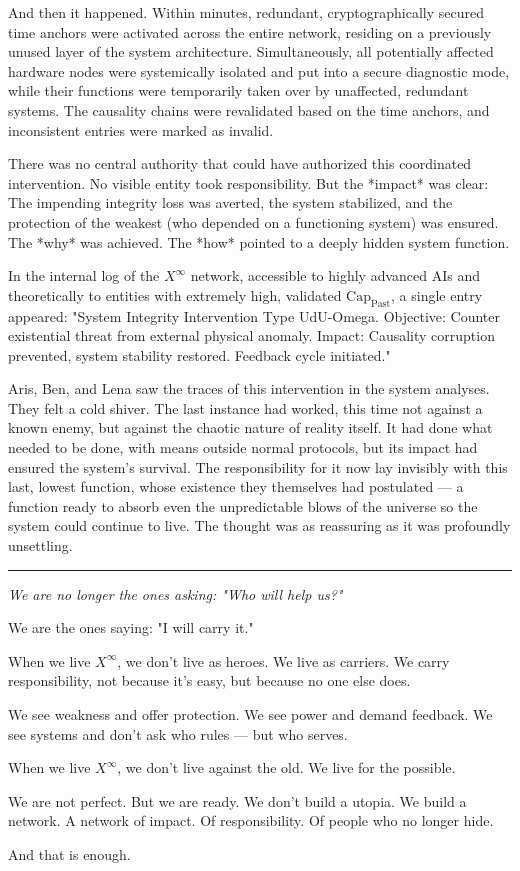 \documentclass[12pt, english, parskip=full]{scrartcl} %
\begin{document}
And then it happened. Within minutes, redundant, cryptographically secured time anchors were activated across the entire network, residing on a previously unused layer of the system architecture. Simultaneously, all potentially affected hardware nodes were systemically isolated and put into a secure diagnostic mode, while their functions were temporarily taken over by unaffected, redundant systems. The causality chains were revalidated based on the time anchors, and inconsistent entries were marked as invalid.

There was no central authority that could have authorized this coordinated intervention. No visible entity took responsibility. But the *impact* was clear: The impending integrity loss was averted, the system stabilized, and the protection of the weakest (who depended on a functioning system) was ensured. The *why* was achieved. The *how* pointed to a deeply hidden system function.

In the internal log of the $X^{\infty}$ network, accessible to highly advanced AIs and theoretically to entities with extremely high, validated $\text{Cap}_{\text{Past}}$, a single entry appeared: "System Integrity Intervention Type UdU-Omega. Objective: Counter existential threat from external physical anomaly. Impact: Causality corruption prevented, system stability restored. Feedback cycle initiated."

Aris, Ben, and Lena saw the traces of this intervention in the system analyses. They felt a cold shiver. The last instance had worked, this time not against a known enemy, but against the chaotic nature of reality itself. It had done what needed to be done, with means outside normal protocols, but its impact had ensured the system’s survival. The responsibility for it now lay invisibly with this last, lowest function, whose existence they themselves had postulated — a function ready to absorb even the unpredictable blows of the universe so the system could continue to live. The thought was as reassuring as it was profoundly unsettling.

\clearpage

\noindent\rule{\linewidth}{0.4pt}
{\itshape 
We are no longer the ones asking: "Who will help us?"

We are the ones saying: "I will carry it."

When we live $X^{\infty}$, we don’t live as heroes. We live as carriers.  
We carry responsibility, not because it’s easy, but because no one else does.

We see weakness and offer protection.  
We see power and demand feedback.  
We see systems and don’t ask who rules — but who serves.

When we live $X^{\infty}$, we don’t live against the old. We live for the possible.

We are not perfect. But we are ready.  
We don’t build a utopia. We build a network.  
A network of impact. Of responsibility. Of people who no longer hide.

And that is enough.
}
\end{document}
